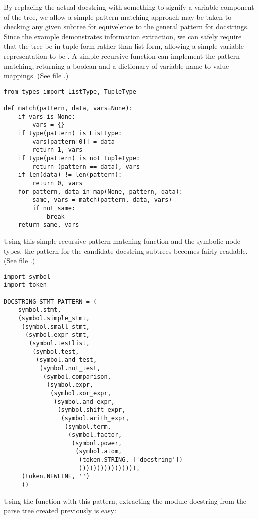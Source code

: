 By replacing the actual docstring with something to signify a variable
component of the tree, we allow a simple pattern matching approach may
be taken to checking any given subtree for equivelence to the general
pattern for docstrings.  Since the example demonstrates information
extraction, we can safely require that the tree be in tuple form
rather than list form, allowing a simple variable representation to be
.  A simple recursive function can implement
the pattern matching, returning a boolean and a dictionary of variable
name to value mappings.  (See file .)

\begin{verbatim}
from types import ListType, TupleType

def match(pattern, data, vars=None):
    if vars is None:
        vars = {}
    if type(pattern) is ListType:
        vars[pattern[0]] = data
        return 1, vars
    if type(pattern) is not TupleType:
        return (pattern == data), vars
    if len(data) != len(pattern):
        return 0, vars
    for pattern, data in map(None, pattern, data):
        same, vars = match(pattern, data, vars)
        if not same:
            break
    return same, vars
\end{verbatim}

Using this simple recursive pattern matching function and the symbolic
node types, the pattern for the candidate docstring subtrees becomes
fairly readable.  (See file .)

\begin{verbatim}
import symbol
import token

DOCSTRING_STMT_PATTERN = (
    symbol.stmt,
    (symbol.simple_stmt,
     (symbol.small_stmt,
      (symbol.expr_stmt,
       (symbol.testlist,
        (symbol.test,
         (symbol.and_test,
          (symbol.not_test,
           (symbol.comparison,
            (symbol.expr,
             (symbol.xor_expr,
              (symbol.and_expr,
               (symbol.shift_expr,
                (symbol.arith_expr,
                 (symbol.term,
                  (symbol.factor,
                   (symbol.power,
                    (symbol.atom,
                     (token.STRING, ['docstring'])
                     )))))))))))))))),
     (token.NEWLINE, '')
     ))
\end{verbatim}

Using the  function with this pattern, extracting the
module docstring from the parse tree created previously is easy:

